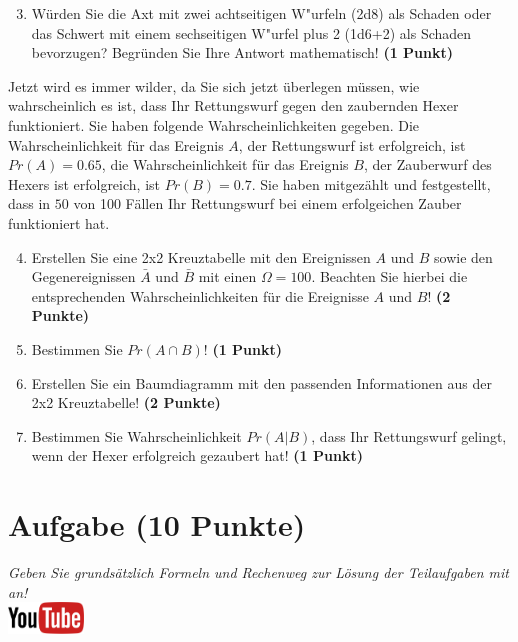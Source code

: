 \documentclass[a4paper, 10pt]{scrartcl}\usepackage[]{graphicx}\usepackage[]{xcolor}
\begin{document}
\begin{enumerate}
  \setcounter{enumi}{2}
\item W{\"u}rden Sie die Axt mit zwei achtseitigen W{"u}rfeln (2d8) als Schaden oder
  das Schwert mit einem sechseitigen W{"u}rfel plus 2 (1d6+2) als Schaden bevorzugen?
  Begr{\"u}nden Sie Ihre Antwort mathematisch! \textbf{(1 Punkt)}
\end{enumerate}

Jetzt wird es immer wilder, da Sie sich jetzt {\"u}berlegen m{\"u}ssen, wie
wahrscheinlich es ist, dass Ihr Rettungswurf gegen den zaubernden Hexer
funktioniert. Sie haben folgende Wahrscheinlichkeiten gegeben. Die
Wahrscheinlichkeit f{\"u}r das Ereignis $A$, der Rettungswurf ist erfolgreich,
ist $Pr(A) = 0.65$, die Wahrscheinlichkeit f{\"u}r das Ereignis $B$,
der Zauberwurf des Hexers ist erfolgreich, ist $Pr(B) = 0.7$. Sie
haben mitgez{\"a}hlt und festgestellt, dass in $50$ von 100 F{\"a}llen
Ihr Rettungswurf bei einem erfolgeichen Zauber funktioniert hat.  

\begin{enumerate}
  \setcounter{enumi}{3}
\item Erstellen Sie eine 2x2 Kreuztabelle mit den Ereignissen $A$ und $B$
  sowie den Gegenereignissen $\bar{A}$ und $\bar{B}$ mit einen
  $\Omega = 100$. Beachten Sie hierbei die entsprechenden
  Wahrscheinlichkeiten f{\"u}r die Ereignisse $A$ und $B$! \textbf{(2 Punkte)}
\item Bestimmen Sie $Pr(A \cap B)$! \textbf{(1 Punkt)}
\item Erstellen Sie ein Baumdiagramm mit den passenden Informationen aus der 2x2
  Kreuztabelle! \textbf{(2 Punkte)}
\item Bestimmen Sie Wahrscheinlichkeit $Pr(A|B)$, dass Ihr Rettungswurf gelingt, wenn
  der Hexer erfolgreich gezaubert hat! \textbf{(1 Punkt)}
\end{enumerate}

  
\clearpage

\section{Aufgabe \hfill (10 Punkte)}

\textit{Geben Sie grunds{\"a}tzlich Formeln und Rechenweg zur L{\"o}sung der
  Teilaufgaben mit an!} \\[1Ex]

\hfill\href{https://youtu.be/aBxLkdF-c4M}{\includegraphics[width =
  2cm]{img/youtube}} %
\hspace{2Ex}
\end{document}
